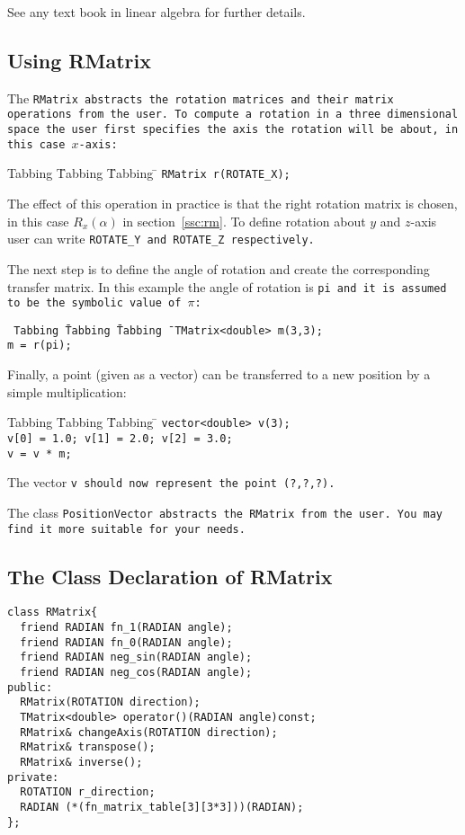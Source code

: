 See any text book in linear algebra for further details.

\subsection{Using RMatrix}

The \tt RMatrix \rm abstracts the rotation matrices and their
matrix operations from the user. To compute a rotation
in a three dimensional space the user first specifies
the axis the rotation will be about, in this case $x$-axis:

\begin{tabbing}
Tabbing \= Tabbing \= Tabbing \= \kill
\>\>\> \tt RMatrix r(ROTATE\_X);
\end{tabbing}

The effect of this operation in practice is that the right rotation matrix 
is chosen, in this case $R_{x}(\alpha)$ in section~\ref{ssc:rm}.
To define rotation about $y$ and $z$-axis user can write 
\tt ROTATE\_Y \rm and \tt ROTATE\_Z \rm respectively. 

The next step is to define the angle of rotation and create the
corresponding transfer matrix. In this example the angle of rotation
is \tt pi \rm and it is assumed to be the symbolic value of $\pi$:

\begin{tabbing}
\tt
Tabbing \= Tabbing \= Tabbing \= \kill
\>\>\>\tt TMatrix<double> m(3,3); \\
\>\>\>\tt  m = r(pi);
\end{tabbing}

Finally, a point (given as a vector) can be transferred 
to a new position by a simple multiplication:

\begin{tabbing}
Tabbing \= Tabbing \= Tabbing \= \kill
\>\>\>\tt vector<double> v(3); \\
\>\>\>\tt v[0] = 1.0; v[1] = 2.0; v[2] = 3.0; \\
\>\>\>\tt v = v * m;
\end{tabbing}

The vector \tt v \rm should now represent the point (?,?,?).

The class \tt PositionVector \rm abstracts the \tt RMatrix \rm
from the user. You may find it more suitable for
your needs.

\subsection{The Class Declaration of RMatrix}
\begin{verbatim}
class RMatrix{
  friend RADIAN fn_1(RADIAN angle);
  friend RADIAN fn_0(RADIAN angle);
  friend RADIAN neg_sin(RADIAN angle);
  friend RADIAN neg_cos(RADIAN angle);
public:
  RMatrix(ROTATION direction);
  TMatrix<double> operator()(RADIAN angle)const;
  RMatrix& changeAxis(ROTATION direction);
  RMatrix& transpose();
  RMatrix& inverse();
private:
  ROTATION r_direction;
  RADIAN (*(fn_matrix_table[3][3*3]))(RADIAN);
};
\end{verbatim}

